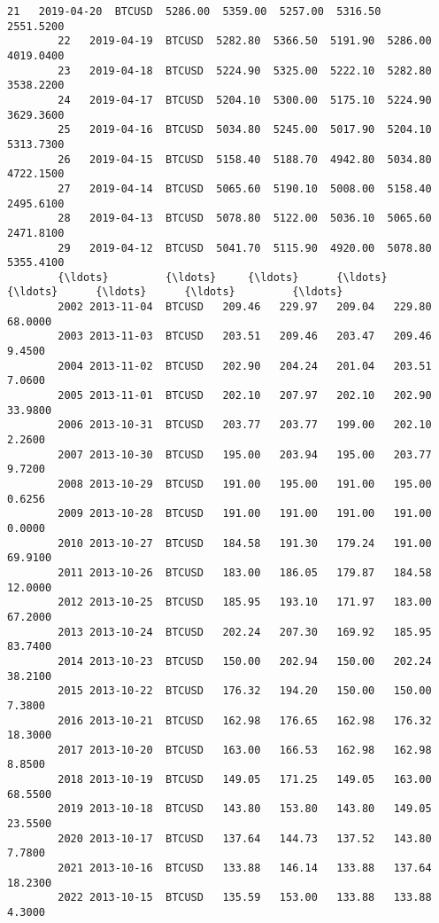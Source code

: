 \documentclass[11pt]{article}
\begin{document}
\begin{Verbatim}[commandchars=\\\{\}]
        21   2019-04-20  BTCUSD  5286.00  5359.00  5257.00  5316.50   2551.5200   
        22   2019-04-19  BTCUSD  5282.80  5366.50  5191.90  5286.00   4019.0400   
        23   2019-04-18  BTCUSD  5224.90  5325.00  5222.10  5282.80   3538.2200   
        24   2019-04-17  BTCUSD  5204.10  5300.00  5175.10  5224.90   3629.3600   
        25   2019-04-16  BTCUSD  5034.80  5245.00  5017.90  5204.10   5313.7300   
        26   2019-04-15  BTCUSD  5158.40  5188.70  4942.80  5034.80   4722.1500   
        27   2019-04-14  BTCUSD  5065.60  5190.10  5008.00  5158.40   2495.6100   
        28   2019-04-13  BTCUSD  5078.80  5122.00  5036.10  5065.60   2471.8100   
        29   2019-04-12  BTCUSD  5041.70  5115.90  4920.00  5078.80   5355.4100   
        {\ldots}         {\ldots}     {\ldots}      {\ldots}      {\ldots}      {\ldots}      {\ldots}         {\ldots}   
        2002 2013-11-04  BTCUSD   209.46   229.97   209.04   229.80     68.0000   
        2003 2013-11-03  BTCUSD   203.51   209.46   203.47   209.46      9.4500   
        2004 2013-11-02  BTCUSD   202.90   204.24   201.04   203.51      7.0600   
        2005 2013-11-01  BTCUSD   202.10   207.97   202.10   202.90     33.9800   
        2006 2013-10-31  BTCUSD   203.77   203.77   199.00   202.10      2.2600   
        2007 2013-10-30  BTCUSD   195.00   203.94   195.00   203.77      9.7200   
        2008 2013-10-29  BTCUSD   191.00   195.00   191.00   195.00      0.6256   
        2009 2013-10-28  BTCUSD   191.00   191.00   191.00   191.00      0.0000   
        2010 2013-10-27  BTCUSD   184.58   191.30   179.24   191.00     69.9100   
        2011 2013-10-26  BTCUSD   183.00   186.05   179.87   184.58     12.0000   
        2012 2013-10-25  BTCUSD   185.95   193.10   171.97   183.00     67.2000   
        2013 2013-10-24  BTCUSD   202.24   207.30   169.92   185.95     83.7400   
        2014 2013-10-23  BTCUSD   150.00   202.94   150.00   202.24     38.2100   
        2015 2013-10-22  BTCUSD   176.32   194.20   150.00   150.00      7.3800   
        2016 2013-10-21  BTCUSD   162.98   176.65   162.98   176.32     18.3000   
        2017 2013-10-20  BTCUSD   163.00   166.53   162.98   162.98      8.8500   
        2018 2013-10-19  BTCUSD   149.05   171.25   149.05   163.00     68.5500   
        2019 2013-10-18  BTCUSD   143.80   153.80   143.80   149.05     23.5500   
        2020 2013-10-17  BTCUSD   137.64   144.73   137.52   143.80      7.7800   
        2021 2013-10-16  BTCUSD   133.88   146.14   133.88   137.64     18.2300   
        2022 2013-10-15  BTCUSD   135.59   153.00   133.88   133.88      4.3000   

\end{Verbatim}
\end{document}
